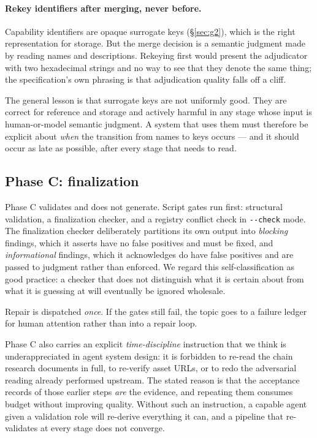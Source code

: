 \documentclass[10pt,a4paper]{article}
\begin{document}
\paragraph{Rekey identifiers after merging, never before.} Capability
identifiers are opaque surrogate keys (\S\ref{sec:g2}), which is the right
representation for storage. But the merge decision is a semantic judgment made by
reading names and descriptions. Rekeying first would present the adjudicator with
two hexadecimal strings and no way to see that they denote the same thing; the
specification's own phrasing is that adjudication quality falls off a cliff.

The general lesson is that surrogate keys are not uniformly good. They are
correct for reference and storage and actively harmful in any stage whose input
is human-or-model semantic judgment. A system that uses them must therefore be
explicit about \emph{when} the transition from names to keys occurs --- and it
should occur as late as possible, after every stage that needs to read.

\subsection{Phase C: finalization}
\label{sec:phaseC}

Phase C validates and does not generate. Script gates run first: structural
validation, a finalization checker, and a registry conflict check in
\texttt{-{}-check} mode. The finalization checker deliberately partitions its own
output into \emph{blocking} findings, which it asserts have no false positives
and must be fixed, and \emph{informational} findings, which it acknowledges do
have false positives and are passed to judgment rather than enforced. We regard
this self-classification as good practice: a checker that does not distinguish
what it is certain about from what it is guessing at will eventually be ignored
wholesale.

Repair is dispatched \emph{once}. If the gates still fail, the topic goes to a
failure ledger for human attention rather than into a repair loop.

Phase C also carries an explicit \emph{time-discipline} instruction that we think
is underappreciated in agent system design: it is forbidden to re-read the chain
research documents in full, to re-verify asset URLs, or to redo the adversarial
reading already performed upstream. The stated reason is that the acceptance
records of those earlier steps \emph{are} the evidence, and repeating them
consumes budget without improving quality. Without such an instruction, a
capable agent given a validation role will re-derive everything it can, and a
pipeline that re-validates at every stage does not converge.
\end{document}
